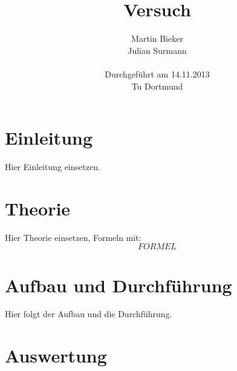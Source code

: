 \documentclass[11pt]{article}
\title{\textbf{Versuch}}
\author{Martin Bieker\\
		Julian Surmann\\
		\\
		Durchgef\"{u}hrt am 14.11.2013\\
		Tu Dortmund}
\date{}
\begin{document}
\renewcommand\tablename{Tabelle}
\renewcommand\figurename{Abbildung}
\maketitle
\thispagestyle{empty}
\newpage
\clearpage
\setcounter{page}{1}


\section{Einleitung}
Hier Einleitung einsetzen.
\section{Theorie}
Hier Theorie einsetzen, Formeln mit:
\begin{equation}
F O R M E L  
\end{equation}
\section{Aufbau und Durchf\"{u}hrung}
Hier folgt der Aufbau und die Durchführung.
\section{Auswertung}
\end{document}
